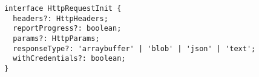 \begin{verbatim}
interface HttpRequestInit {
  headers?: HttpHeaders;
  reportProgress?: boolean;
  params?: HttpParams;
  responseType?: 'arraybuffer' | 'blob' | 'json' | 'text';
  withCredentials?: boolean;
}
\end{verbatim}
